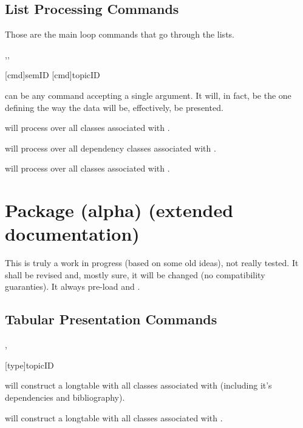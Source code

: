 \documentclass[article,nogeometry,english,tocdepth=3,secdepth=3]{ufrgscca} %
\begin{document}
\subsection{List Processing Commands}
Those are the main loop commands that go through the lists.
\begin{codedescribe}{\LstClass,\LstDep,\LstTopic}
    \begin{codesyntax}
        \tsmacro{\LstClass}[cmd]{semID}
        \tsmacro{\LstTopic}[cmd]{topicID}
    \end{codesyntax}
 can be any command accepting a single argument. It will, in fact, be the one defining the way the data will be, effectively, be presented.

\tsmacro{\LstClass}{} will process  over all classes associated with .

\tsmacro{\LstDep}{} will process  over all dependency classes associated with .

\tsmacro{\LstTopic}{} will process  over all classes associated with .

\end{codedescribe}

\section{ Package (alpha) (ex\-tend\-ed documentation)}
This is truly a work in progress (based on some old ideas), not really tested. It shall be revised and, mostly sure, it will be changed (no compatibility guaranties).  It always pre-load  and .

\subsection{Tabular Presentation Commands}
\begin{codedescribe}{\TabEtp,\TabTopic}
    \begin{codesyntax}%
        \tsmacro{\TabTopic}[type]{topicID}
    \end{codesyntax}
\tsmacro{\TabEtp}{} will construct a longtable with all classes associated with  (including it's dependencies and bibliography).

\tsmacro{\TabTopic}{} will construct a longtable with all classes associated with .

\end{codedescribe}
\end{document}
